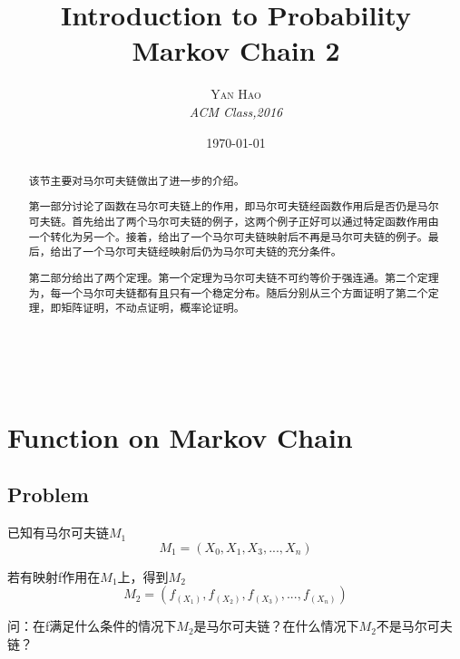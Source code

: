 \documentclass[a4paper, 11pt]{article} %
\title{\textbf{Introduction to Probability}\\ %
Markov Chain 2} %
\author{\textsc{Yan Hao} %
\\{\textit{ACM Class,2016}}} %
\date{\today} %
\makeatletter
\renewcommand{\maketitle}{ %

\begin{flushright} %
{\LARGE\@title} %

\vspace{50pt} %

{\large\@author} %
\\\@date %

\vspace{10pt} %
\end{flushright}
}
\makeatother
\begin{document}
\maketitle %



\begin{abstract}
该节主要对马尔可夫链做出了进一步的介绍。

第一部分讨论了函数在马尔可夫链上的作用，即马尔可夫链经函数作用后是否仍是马尔可夫链。首先给出了两个马尔可夫链的例子，这两个例子正好可以通过特定函数作用由一个转化为另一个。接着，给出了一个马尔可夫链映射后不再是马尔可夫链的例子。最后，给出了一个马尔可夫链经映射后仍为马尔可夫链的充分条件。

第二部分给出了两个定理。第一个定理为马尔可夫链不可约等价于强连通。第二个定理为，每一个马尔可夫链都有且只有一个稳定分布。随后分别从三个方面证明了第二个定理，即矩阵证明，不动点证明，概率论证明。
\end{abstract}
\vspace{10pt} %

\tableofcontents
\newpage
\section{Function on Markov Chain}
\subsection{Problem}
\begin{small}
已知有马尔可夫链$M_1$
$$
M_1=\left(X_0,X_1,X_3,...,X_n\right)
$$

若有映射f作用在$M_1$上，得到$M_2$
$$
M_2=\left(f_{(X_1)},f_{(X_2)},f_{(X_3)},...,f_{(X_n)}\right)
$$

问：在f满足什么条件的情况下$M_2$是马尔可夫链？在什么情况下$M_2$不是马尔可夫链？
\end{small}
\end{document}
